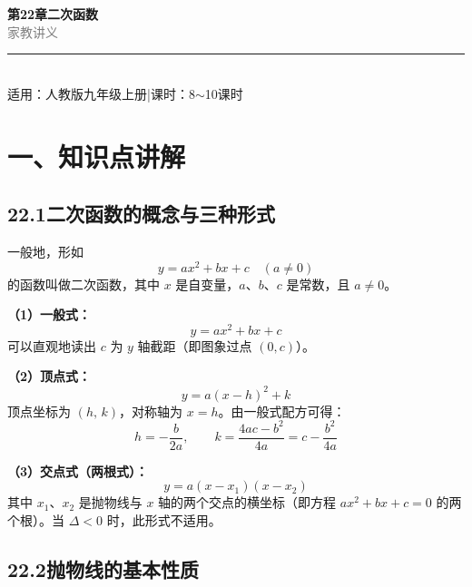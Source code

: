\documentclass[12pt, a4paper]{ctexart}
\begin{document}
\begin{center}
{\Huge\bfseries\textcolor{mainblue}{第22章\quad 二次函数}}\\[12pt]
{\Large\textcolor{gray}{家\quad 教\quad 讲\quad 义}}\\[8pt]
\rule{0.6\textwidth}{1pt}\\[8pt]
{\normalsize 适用：人教版九年级上册\quad |\quad 课时：8$\sim$10课时}
\end{center}
\vspace{10pt}

\section*{\textcolor{mainblue}{一、知识点讲解}}

\subsection*{22.1\quad 二次函数的概念与三种形式}

\begin{knowledgebox}[二次函数的定义]
一般地，形如
\[
\boxed{y = ax^2 + bx + c \quad (a \neq 0)}
\]
的函数叫做二次函数，其中 $x$ 是自变量，$a$、$b$、$c$ 是常数，且 $a \neq 0$。
\end{knowledgebox}

\begin{knowledgebox}[二次函数的三种表达形式]
\textbf{（1）一般式：}
\[
y = ax^2 + bx + c
\]
可以直观地读出 $c$ 为 $y$ 轴截距（即图象过点 $(0,c)$）。

\medskip
\textbf{（2）顶点式：}
\[
\boxed{y = a(x-h)^2 + k}
\]
顶点坐标为 $(h,\,k)$，对称轴为 $x=h$。由一般式配方可得：
\[
h = -\frac{b}{2a}, \qquad k = \frac{4ac - b^2}{4a} = c - \frac{b^2}{4a}
\]

\medskip
\textbf{（3）交点式（两根式）：}
\[
y = a(x - x_1)(x - x_2)
\]
其中 $x_1$、$x_2$ 是抛物线与 $x$ 轴的两个交点的横坐标（即方程 $ax^2+bx+c=0$ 的两个根）。当 $\Delta < 0$ 时，此形式不适用。
\end{knowledgebox}

\subsection*{22.2\quad 抛物线的基本性质}
\end{document}
